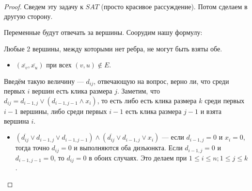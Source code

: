 \documentclass[a4paper, 12pt]{article}
\begin{document}
\begin{proof}
  Сведем эту задачу к $SAT$ (просто красивое рассуждение).
  Потом сделаем в другую сторону.

  \begin{center}
  \end{center}

  Переменные будут отвечать за вершины. Соорудим нашу формулу:

  Любые 2 вершины, между которыми нет ребра, не могут быть взяты обе.
  \begin{itemize}
    \item $(\overline{x_v}, \overline{x_u})$ при всех $(v, u) \not\in E$.
  \end{itemize}

  Введём такую величину --- $d_{ij}$, отвечающую на вопрос, верно ли, что
  среди первых $i$ вершин есть клика размера $j$. Заметим, что 
  $d_{ij} = d_{i - 1, j} \vee (d_{i-1,j-1} \wedge x_i)$, то есть либо есть
  клика размера $k$ среди первых $i - 1$ вершины, либо среди первых $i - 1$
  есть клика размера $j - 1$ и взята вершина $i$.

  \begin{itemize}
    \item $(\overline{d_{ij}} \vee d_{i - 1, j} \vee d_{i - 1, j - 1}) \wedge
    (\overline{d_{ij}} \vee d_{i - 1, j} \vee x_i)$ --- если $d_{i - 1, j} = 0$
    и $x_i = 0$, тогда точно $d_{ij} = 0$ и выполняются оба дизъюнкта.
    Если $d_{i - 1, j} = 0$ и $d_{i - 1, j - 1} = 0$, то $d_{ij} = 0$ в обоих
    случаях. Это делаем при $1 \leqslant i \leqslant n; 1 \leqslant j \leqslant k$.


\end{itemize}
\end{proof}
\end{document}
